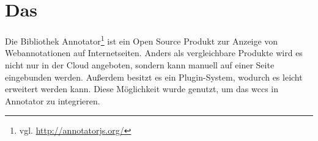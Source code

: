\section{Das {\annotatorPlugin}}
    \label{section:solutionDetailsAnnotatorPlugin}
    Die Bibliothek Annotator\footnote{vgl. \url{http://annotatorjs.org/}}
    ist ein Open Source Produkt zur Anzeige von Webannotationen auf Internetseiten.
    Anders als vergleichbare Produkte wird es nicht nur in der Cloud angeboten,
    sondern kann manuell auf einer Seite eingebunden werden.
    Außerdem besitzt es ein Plugin-System, wodurch es leicht erweitert werden kann.
    Diese Möglichkeit wurde genutzt,
    um das \gls{wccs} in Annotator zu integrieren.

    
    